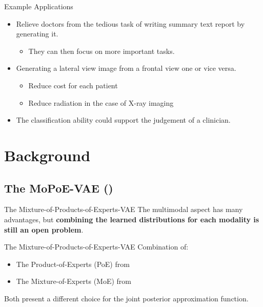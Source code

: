    \begin{frame}{Example Applications}
    \begin{itemize}
        \pause
        \item Relieve doctors from the tedious task of writing summary text report by generating it.
        \pause
        \begin{itemize}
            \item They can then focus on more important tasks.
        \end{itemize}
        \pause
        \item Generating a lateral view image from a frontal view one or vice versa.
        \pause
        \begin{itemize}
            \item Reduce cost for each patient
            \item Reduce radiation in the case of X-ray imaging
        \end{itemize}
        \pause
        \item The classification ability could support the judgement of a clinician.
    \end{itemize}

    \end{frame}

    \section{Background}

    \subsection{The MoPoE-VAE (\cite{thomas_gener-ELBO})}
    \begin{frame}{The Mixture-of-Products-of-Experts-VAE}
        The multimodal aspect has many advantages, but \textbf{combining the learned distributions for each modality is still an open problem}.
    \end{frame}

    \begin{frame}{The Mixture-of-Products-of-Experts-VAE}
        Combination of:
        \begin{itemize}
            \item The Product-of-Experts (PoE) from \cite{wu2018multimodal}
            \item The Mixture-of-Experts (MoE) from \cite{shi2019variational}
        \end{itemize}
        \vspace{\baselineskip}
        Both present a different choice for the joint posterior approximation function.
    \end{frame}


